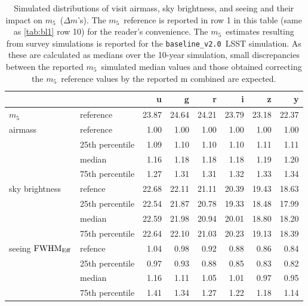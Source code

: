 \documentclass[PST,authoryear,toc]{lsstdoc}
\newcommand{\mf}{\ensuremath{m_5}}
\newcommand{\baseline}{\texttt{baseline\_v2.0}}
\newcommand{\fwhme}{\ensuremath{{\rm FWHM}_\mathrm{Eff}}}
\begin{document}
\begin{table}
\caption{Simulated distributions of visit airmass, sky brightness, and seeing and their impact on \mf\ ($\Delta m$'s). The \mf\ reference is reported in row 1 in this table (same as \autoref{tab:bl1} row 10) for the reader's convenience. The \mf\ estimates resulting from survey simulations is reported for the \baseline\ LSST simulation. As these are calculated as medians over the 10-year simulation, small discrepancies between the reported \mf\ simulated median values and those obtained correcting the \mf\ reference values by the reported \Delta m combined are expected.}\label{tab:bl2}
    \centering
\begin{tabular}{llrrrrrr}
\hline
{} &&      u &      g &      r &      i &      z &      y \\
\hline
\mf &reference %
&  23.87 &  24.64 &  24.21 &  23.79 &  23.18 &  22.37 \\
\hline
\hline
airmass &reference                 &   1.00 &   1.00 &   1.00 &   1.00 &   1.00 &   1.00 \\
 &25th percentile       &   1.09 &   1.10 &   1.10 &   1.10 &   1.11 &   1.11 \\
 &median                &   1.16 &   1.18 &   1.18 &   1.18 &   1.19 &   1.20 \\
 &75th percentile       &   1.27 &   1.31 &   1.31 &   1.32 &   1.33 &   1.34 \\
\hline
sky brightness& refence           &  22.68 &  22.11 &  21.11 &  20.39 &  19.43 &  18.63 \\
 &25th percentile &  22.54 &  21.87 &  20.78 &  19.33 &  18.48 &  17.99 \\
& median          &  22.59 &  21.98 &  20.94 &  20.01 &  18.80 &  18.20 \\
 &75th percentile &  22.64 &  22.10 &  21.03 &  20.23 &  19.13 &  18.39 \\
\hline
seeing \fwhme& refence             &   1.04 &   0.98 &   0.92 &   0.88 &   0.86 &   0.84 \\
 &25th percentile &   0.97 &   0.93 &   0.88 &   0.85 &   0.83 &   0.82 \\
 &median          &   1.16 &   1.11 &   1.05 &   1.01 &   0.97 &   0.95 \\
 &75th percentile &   1.41 &   1.34 &   1.27 &   1.22 &   1.18 &   1.14 \\


\end{tabular}
\end{table}
\end{document}
